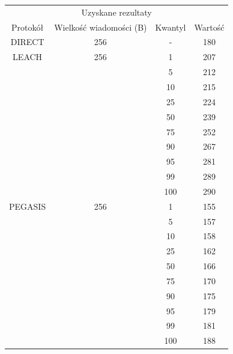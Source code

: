 \documentclass[a4paper,12pt,twoside,openany]{report}
\begin{document}
\begin{longtable}{*{4}{c}}
\toprule
\multicolumn{4}{c}{Uzyskane rezultaty} \\
Protokół	& Wielkość wiadomości (B)	& Kwantyl	& Wartość \\
\midrule
\endhead
DIRECT	& 256 	& -	& 180 \\*
\midrule
LEACH	& 256	& 1	& 207 \\*
	&	& 5	& 212 \\*
	&	& 10	& 215 \\*
	&	& 25	& 224 \\*
	&	& 50	& 239 \\*
	&	& 75	& 252 \\*
	&	& 90	& 267 \\*
	&	& 95	& 281 \\*
	&	& 99	& 289 \\*
	&	& 100	& 290 \\*
\midrule
PEGASIS	& 256	& 1	& 155 \\*
	&	& 5	& 157 \\*
	&	& 10	& 158 \\*
	&	& 25	& 162 \\*
	&	& 50	& 166 \\*
	&	& 75	& 170 \\*
	&	& 90	& 175 \\*
	&	& 95	& 179 \\*
	&	& 99	& 181 \\*
	&	& 100	& 188 \\*
\bottomrule
\end{longtable}
\end{document}
